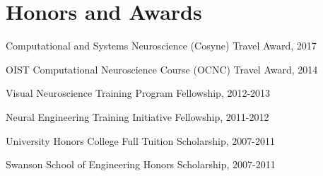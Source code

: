 \documentclass[10pt,letterpaper]{article}
\renewenvironment{itemize}{
  \begin{list}{}{
    \setlength{\leftmargin}{1.5em}
    \setlength{\itemsep}{0.25em}
    \setlength{\parskip}{0pt}
    \setlength{\parsep}{0.25em}
  }
}{
  \end{list}
}
\begin{document}
\vspace{-0.25in}

\section*{Honors and Awards}
\vspace{-0.05in}
\begin{itemize}
  \setlength\itemsep{1pt}
  \item Computational and Systems Neuroscience (Cosyne) Travel Award, 2017
  \item OIST Computational Neuroscience Course (OCNC) Travel Award, 2014
  \item Visual Neuroscience Training Program Fellowship, 2012-2013
\item Neural Engineering Training Initiative Fellowship, 2011-2012
\item University Honors College Full Tuition Scholarship, 2007-2011
\item Swanson School of Engineering Honors Scholarship, 2007-2011
\end{itemize}

\vspace{-0.25in}
\end{document}
